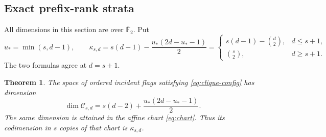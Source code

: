 \documentclass[11pt,a4paper]{article}
\newcommand{\F}{\mathbb F}
\newcommand{\Ccal}{\mathcal C}
\newtheorem{theorem}{Theorem}[section]
\theoremstyle{definition}
\theoremstyle{remark}
\numberwithin{equation}{section}
\begin{document}
\subsection{Exact prefix-rank strata}\label{sec:exact}
All dimensions in this section are over $\overline{\F}_2$. Put
\begin{equation}\label{eq:kappa}
u_* =\min(s,d-1),\qquad
\kappa_{s,d}=s(d-1)-\frac{u_*(2d-u_*-1)}2
=\begin{cases}
s(d-1)-\binom d2,&d\le s+1,\\
\binom s2,&d\ge s+1.
\end{cases}
\end{equation}
The two formulas agree at $d=s+1$.

\begin{theorem}\label{thm:exact-dimension}
The space of ordered incident flags satisfying \eqref{eq:clique-config} has dimension
\[
\dim\Ccal_{s,d}=s(d-2)+\frac{u_*(2d-u_*-1)}2.
\]
The same dimension is attained in the affine chart \eqref{eq:chart}. Thus its codimension in $s$ copies of that chart is $\kappa_{s,d}$.
\end{theorem}
\end{document}
